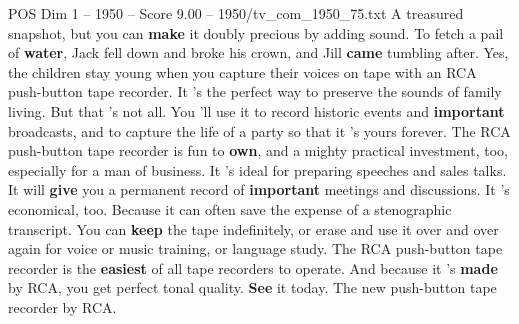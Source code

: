 \begin{textsample}{POS Dim 1 – 1950 – Score 9.00 – 1950/tv\_com\_1950\_75.txt}  \label{ex:f1_pos_012}
A treasured snapshot, but you can \textbf{make} it doubly precious by adding sound.
To fetch a pail of \textbf{water}, Jack fell down and broke his crown, and Jill \textbf{came} tumbling after.
Yes, the children stay young when you capture their voices on tape with an RCA push-button tape recorder.
It 's the perfect way to preserve the sounds of family living.
But that 's not all.
You 'll use it to record historic events and \textbf{important} broadcasts, and to capture the life of a party so that it 's yours forever.
The RCA push-button tape recorder is fun to \textbf{own}, and a mighty practical investment, too, especially for a man of business.
It 's ideal for preparing speeches and sales talks.
It will \textbf{give} you a permanent record of \textbf{important} meetings and discussions.
It 's economical, too.
Because it can often save the expense of a stenographic transcript.
You can \textbf{keep} the tape indefinitely, or erase and use it over and over again for voice or music training, or language study.
The RCA push-button tape recorder is the \textbf{easiest} of all tape recorders to operate.
And because it 's \textbf{made} by RCA, you get perfect tonal quality. \textbf{See} it today.
The new push-button tape recorder by RCA.

\end{textsample}
